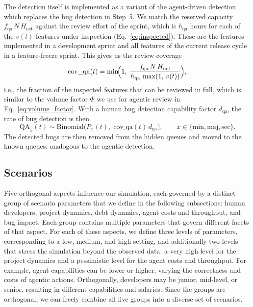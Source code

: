 \documentclass[smallextended]{svjour3}       %
\begin{document}
The detection itself is implemented as a variant of the agent-driven detection which replaces the bug detection in Step~5. We match the reserved capacity $f_\mathrm{qa}\,N\,H_\mathrm{net}$ against the review effort of the sprint, which is $h_\mathrm{qa}$ hours for each of the $v(t)$ features under inspection (Eq.~\eqref{eq:inspected}). These are the features implemented in a development sprint and all features of the current release cycle in a feature-freeze sprint. This gives us the review coverage
\begin{equation}
  \mathrm{cov\_qa}(t) = \min\!\Bigl(1,\;
    \frac{f_\mathrm{qa}\,N\,H_\mathrm{net}}
         {h_\mathrm{qa}\,\max(1,\,v(t))}\Bigr),
  \label{eq:cov_qa}
\end{equation}
i.e., the fraction of the inspected features that can be reviewed in full, which is similar to the volume factor $\Phi$ we use for agentic review in Eq.~\eqref{eq:volume_factor}. With a human bug detection capability factor $d_\mathrm{qa}$, the rate of bug detection is then
\begin{equation}
  \mathrm{QA}_x(t) \sim \mathrm{Binomial}\!\bigl(P_x(t),\; \mathrm{cov\_qa}(t)\,d_\mathrm{qa}\bigr),
    \qquad x \in \{\mathrm{min,maj,sec}\}.
  \label{eq:qa_human}
\end{equation}
The detected bugs are then removed from the hidden queues and moved to the known queues, analogous to the agentic detection. 

\subsection{Scenarios}
\label{sec:setup:scenarios}

Five orthogonal aspects influence our simulation, each governed by a distinct group of scenario parameters that we define in the following subsections: human developers, project dynamics, debt dynamics, agent costs and throughput, and bug impact. Each group contains multiple parameters that govern different facets of that aspect. For each of these aspects, we define three levels of parameters, corresponding to a low, medium, and high setting, and additionally two levels that stress the simulation beyond the observed data: a very high level for the project dynamics and a pessimistic level for the agent costs and throughput. For example, agent capabilities can be lower or higher, varying the correctness and costs of agentic actions. Orthogonally, developers may be junior, mid-level, or senior, resulting in different capabilities and salaries. 
Since the groups are orthogonal, we can freely combine all five groups into a diverse set of scenarios. 
\end{document}
